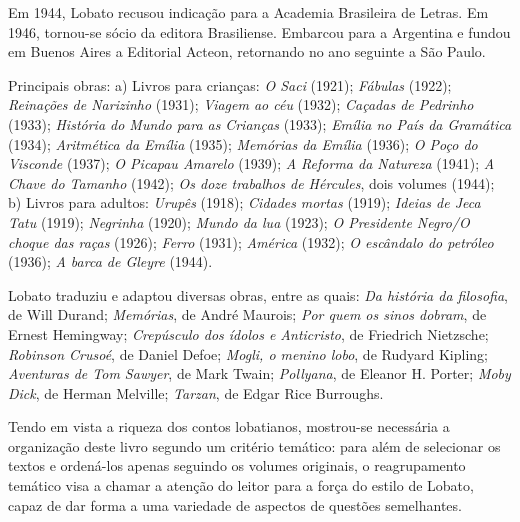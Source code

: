 \documentclass[11pt]{extarticle}
\begin{document}
Em 1944, Lobato recusou indicação para a Academia Brasileira de Letras.
Em 1946, tornou-se sócio da editora Brasiliense. Embarcou para a
Argentina e fundou em Buenos Aires a Editorial Acteon, retornando no ano
seguinte a São Paulo.

Principais obras: a) Livros para crianças: \emph{O Saci} (1921);
\emph{Fábulas} (1922); \emph{Reinações de Narizinho} (1931);
\emph{Viagem ao céu} (1932); \emph{Caçadas de Pedrinho} (1933);
\emph{História do Mundo para as} \emph{Crianças} (1933); \emph{Emília no
País da Gramática} (1934); \emph{Aritmética da Emília} (1935);
\emph{Memórias da Emília} (1936); \emph{O Poço do Visconde} (1937);
\emph{O Picapau Amarelo} (1939); \emph{A Reforma da Natureza} (1941);
\emph{A Chave do Tamanho} (1942); \emph{Os doze trabalhos de Hércules},
dois volumes (1944); b) Livros para adultos: \emph{Urupês} (1918);
\emph{Cidades} \emph{mortas} (1919); \emph{Ideias de Jeca Tatu} (1919);
\emph{Negrinha} (1920); \emph{Mundo da lua} (1923); \emph{O Presidente
Negro/O choque das raças} (1926); \emph{Ferro} (1931); \emph{América}
(1932); \emph{O escândalo do petróleo} (1936); \emph{A barca de Gleyre}
(1944).


Lobato traduziu e adaptou diversas obras, entre as quais: \emph{Da
história da filosofia}, de Will Durand; \emph{Memórias}, de André
Maurois; \emph{Por quem os sinos dobram}, de Ernest Hemingway;
\emph{Crepúsculo dos ídolos e Anticristo}, de Friedrich Nietzsche;
\emph{Robinson Crusoé}, de Daniel Defoe; \emph{Mogli, o menino lobo}, de
Rudyard Kipling; \emph{Aventuras de Tom Sawyer}, de Mark Twain;
\emph{Pollyana}, de Eleanor H. Porter; \emph{Moby Dick}, de Herman
Melville; \emph{Tarzan}, de Edgar Rice Burroughs.


Tendo em vista a riqueza dos contos lobatianos, mostrou-se necessária a
organização deste livro segundo um critério temático: para além de
selecionar os textos e ordená-los apenas seguindo os volumes originais,
o reagrupamento temático visa a chamar a atenção do leitor para a força
do estilo de Lobato, capaz de dar forma a uma variedade de aspectos de
questões semelhantes.
\end{document}
